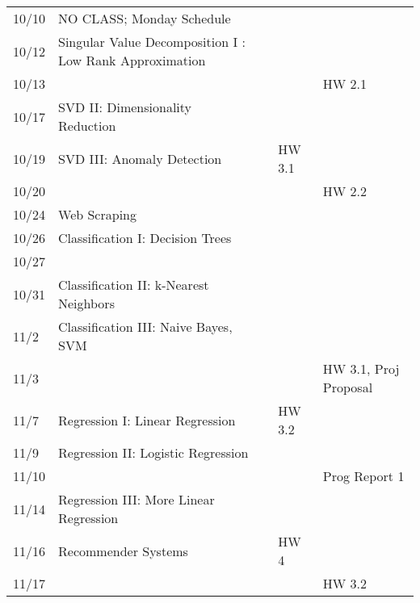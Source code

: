 \documentclass[11pt]{article}
\begin{document}
\begin{centering}
\begin{tabular}{||l|p{3in}|l|l|l||}
10/10 &  NO CLASS; Monday Schedule &  & &  \\   
10/12 & Singular Value Decomposition I : Low Rank Approximation & & & \\
10/13 &&&& HW 2.1 \\
\hline

10/17 & SVD II: Dimensionality Reduction &&&\\
%
10/19 & SVD III: Anomaly Detection & & HW 3.1 & \\ 
10/20 &&&& HW 2.2 \\

\hline

 10/24 & Web Scraping & &  & \\ 
10/26 & Classification I: Decision Trees & & & \\ 
10/27 &&&& \\
\hline

10/31 & Classification II: k-Nearest Neighbors & &  &\\ 
11/2 & Classification III: Naive Bayes, SVM & & &\\ 
11/3 &&&& HW 3.1, Proj Proposal\\
\hline

11/7 & Regression I: Linear Regression && HW 3.2  &\\ 
11/9 & Regression II: Logistic Regression & & & \\ 
11/10 &&&& Prog Report 1\\
\hline

11/14 & Regression III: More Linear Regression & & &\\ 
11/16 & Recommender Systems & & HW 4 & \\
11/17 &&&& HW 3.2\\
\hline


\end{tabular}
\end{centering}
\end{document}
